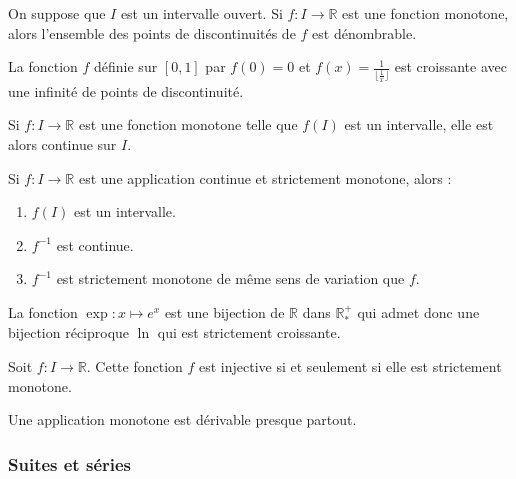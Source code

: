 	\begin{theorem}
		On suppose que $I$ est un intervalle ouvert. Si $f : I \rightarrow \mathbb{R}$ est une fonction monotone, alors l'ensemble des points de discontinuités de $f$ est dénombrable.
	\end{theorem}

	\begin{example}
		La fonction $f$ définie sur $[0,1]$ par $f(0) = 0$ et $f(x) = \frac{1}{\lfloor \frac{1}{x} \rfloor}$ est croissante avec une infinité de points de discontinuité.
	\end{example}


	\begin{proposition}
		Si $f : I \rightarrow \mathbb{R}$ est une fonction monotone telle que $f(I)$ est un intervalle, elle est alors continue sur $I$.
	\end{proposition}

	\begin{theorem}[Bijection]
		Si $f : I \rightarrow \mathbb{R}$ est une application continue et strictement monotone, alors :
		\begin{enumerate}[label=(\roman*)]
			\item $f(I)$ est un intervalle.
			\item $f^{-1}$ est continue.
			\item $f^{-1}$ est strictement monotone de même sens de variation que $f$.
		\end{enumerate}
	\end{theorem}

	\begin{example}
		La fonction $\exp : x \mapsto e^x$ est une bijection de $\mathbb{R}$ dans $\mathbb{R}^{+}_{*}$ qui admet donc une bijection réciproque $\ln$ qui est strictement croissante.
	\end{example}

	\begin{proposition}
		Soit $f : I \rightarrow \mathbb{R}$. Cette fonction $f$ est injective si et seulement si elle est strictement monotone.
	\end{proposition}


	\begin{theorem}[Lebesgue]
		Une application monotone est dérivable presque partout.
	\end{theorem}

	\subsubsection{Suites et séries}

